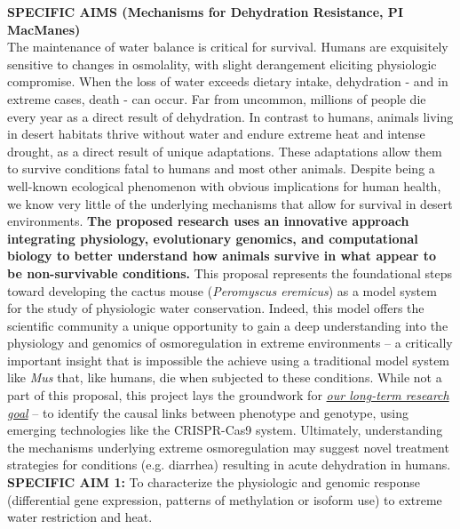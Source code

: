 \documentclass[11pt]{article}
\begin{document}
\setlength{\parindent}{1cm}

\pagestyle{empty}

\noindent \textbf{SPECIFIC AIMS (Mechanisms for Dehydration Resistance, PI MacManes)} \\

The maintenance of water balance is critical for survival. Humans are exquisitely sensitive to changes in osmolality, with slight derangement eliciting physiologic compromise. When the loss of water exceeds dietary intake, dehydration - and in extreme cases, death - can occur. Far from uncommon, millions of people die every year as a direct result of dehydration. In contrast to humans, animals living in desert habitats thrive without water and endure extreme heat and intense drought, as a direct result of unique adaptations. These adaptations allow them to survive conditions fatal to humans and most other animals. Despite being a well-known ecological phenomenon with obvious implications for human health, we know very little of the underlying mechanisms that allow for survival in desert environments. \textbf{The proposed research uses an innovative approach integrating physiology, evolutionary genomics, and computational biology to better understand how animals survive in what appear to be non-survivable conditions.} This proposal represents the foundational steps toward developing the cactus mouse (\textit{Peromyscus eremicus}) as a model system for the study of physiologic water conservation. Indeed, this model offers the scientific community a unique opportunity to gain a deep understanding into the physiology and genomics of osmoregulation in extreme environments – a critically important insight that is impossible the achieve using a traditional model system like \textit{Mus} that, like humans, die when subjected to these conditions. While not a part of this proposal, this project lays the groundwork for \ul{\emph{our long-term research goal}} – to identify the causal links between phenotype and genotype, using emerging technologies like the CRISPR-Cas9 system. Ultimately, understanding the mechanisms underlying extreme osmoregulation may suggest novel treatment strategies for conditions (e.g. diarrhea) resulting in acute dehydration in humans.\\

\noindent \textbf{SPECIFIC AIM 1:} To characterize the physiologic and genomic response (differential gene expression, patterns of methylation or isoform use) to extreme water restriction and heat.  
\end{document}
